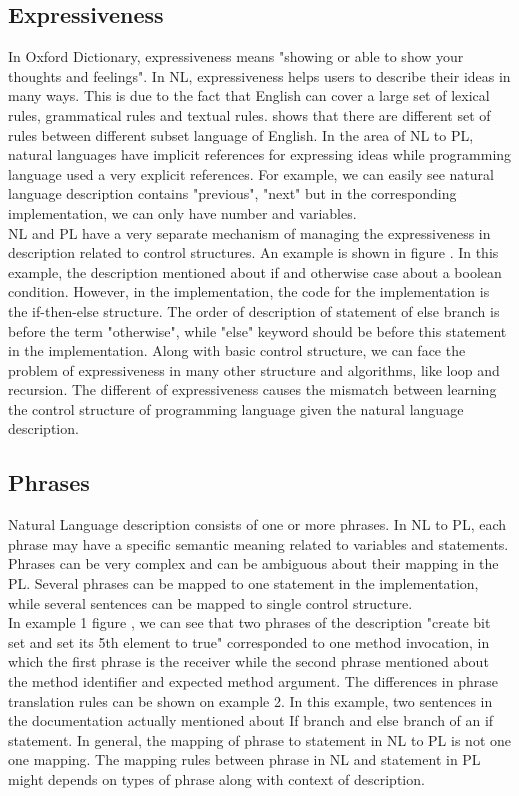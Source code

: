 \subsection{Expressiveness}
In Oxford Dictionary, expressiveness means "showing or able to show your thoughts and feelings". In NL, expressiveness helps users to describe their ideas in many ways.  This is due to the fact that English can cover a large set of lexical rules, grammatical rules and textual rules. \cite{} shows that there are different set of rules between different subset language of English. In the area of NL to PL, natural languages have implicit references for expressing ideas while programming language used a very explicit references. For example, we can easily see natural language description contains "previous", "next" but in the corresponding implementation, we can only have number and variables. \\
NL and PL have a very separate mechanism of managing the expressiveness in description related to control structures. An example is shown in figure \cite{}. In this example, the description mentioned about if and otherwise case about a boolean condition. However, in the implementation, the code for the implementation is the if-then-else structure. The order of description of statement of else branch is before the term "otherwise", while "else" keyword should be before this statement in the implementation. Along with basic control structure, we can face the problem of expressiveness in many other structure and algorithms, like loop and recursion. The different of expressiveness causes the mismatch between learning the control structure of programming language given the natural language description. 
\subsection{Phrases}
Natural Language description consists of one or more phrases. In NL to PL, each phrase may have a specific semantic  meaning related to variables and statements. Phrases can be very complex and can be ambiguous about their mapping in the PL. Several phrases can be mapped to one statement in the implementation, while several sentences can be mapped to single control structure. \\

In example 1 figure \cite{}, we can see that two phrases of the description "create bit set and set its 5th element to true" corresponded to one method invocation, in which the first phrase is the receiver while the second phrase mentioned about the method identifier and expected method argument. The differences in phrase translation rules can be shown on example 2. In this example, two sentences in the documentation actually mentioned about If branch and else branch of an if statement. In general, the mapping of phrase to statement in NL to PL is not one one mapping. The mapping rules between phrase in NL and statement in PL might depends on types of phrase along with context of description.
   
